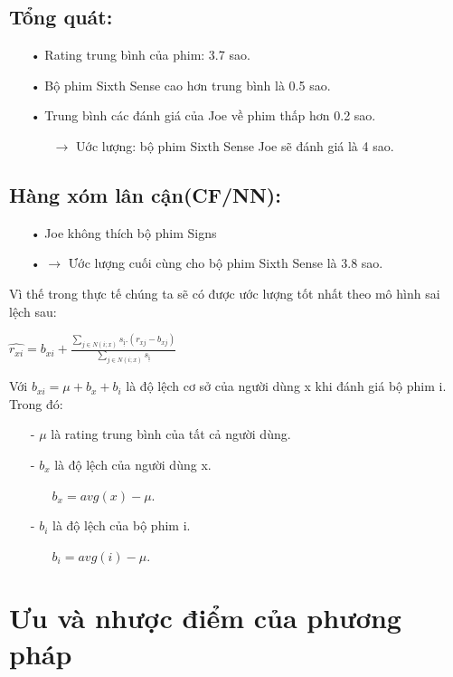 \documentclass[a4paper,10pt]{report}
\begin{document}
\subsection{Tổng quát:}
\begin{itemize}
\item[•] Rating trung bình của phim: 3.7 sao.
\item[•] Bộ phim Sixth Sense cao hơn trung bình là 0.5 sao.
\item[•] Trung bình các đánh giá của Joe về phim thấp hơn 0.2 sao.
\begin{itemize}
\item[] $\rightarrow$ Uớc lượng: bộ phim Sixth Sense Joe sẽ đánh giá là 4 sao.
\end{itemize}
\end{itemize}
\subsection{Hàng xóm lân cận(CF/NN):}
\begin{itemize}
\item[•] Joe không thích bộ phim Signs
\item[•] $\rightarrow$ Ước lượng cuối cùng cho bộ phim Sixth Sense là 3.8 sao.
\end{itemize}
Vì thế trong thực tế chúng ta sẽ có được ước lượng tốt nhất theo mô hình sai lệch sau:
\newpage
\begin{center}
\huge{
$\hat{r_{xi}} = b_{xi} + \frac{\sum_{j\in N(i;x)}s_{ị}.(r_{xj} - b_{xj})}{\sum_{j\in N(i;x)}s_{ị} }$
}
\end{center}
Với $b_{xi} = \mu + b_x + b_i$ là độ lệch cơ sở của người dùng x khi đánh giá bộ phim i. Trong đó:
\begin{itemize}
\item[-] $\mu$ là rating trung bình của tất cả người dùng.
\item[-] $b_x$ là độ lệch của người dùng x.
\begin{itemize}
\item[] $b_x = avg(x) - \mu $.
\end{itemize}
\item[-] $b_i$ là độ lệch của bộ phim i.
\begin{itemize}
\item[] $b_i = avg(i) - \mu $.
\end{itemize}
\end{itemize}
\section{Ưu và nhược điểm của phương pháp}
\end{document}
